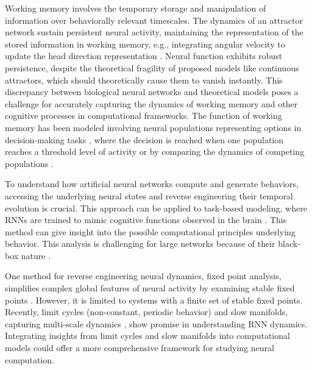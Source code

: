 \documentclass[12pt,letterpaper, onecolumn]{article}
\theoremstyle{definition}
\theoremstyle{remark}
\begin{document}
Working memory involves the temporary storage and manipulation of information over behaviorally relevant timescales. The dynamics of an attractor network sustain persistent neural activity, maintaining the representation of the stored information in working memory, e.g., integrating angular velocity to update the head direction representation \citep{barak2013, barak2014, durstewitz2000, wolpert1995, goncalves2014, burak2009, goldman2007, aksay2007, noorman2022, cueva2021a, cueva2021b}.
Neural function exhibits robust persistence, despite the theoretical fragility of proposed models like continuous attractors, which should theoretically cause them to vanish instantly.
 This discrepancy between biological neural networks and theoretical models poses a challenge for accurately capturing the dynamics of working memory and other cognitive processes in computational frameworks.
The function of working memory has been modeled involving neural populations representing options in decision-making tasks \citep{gold2007neural}, where the decision is reached when one population reaches a threshold level of activity or by comparing the dynamics of competing populations \citep{wong2007, wong2008, hocker2024, esnaola2022flexible}.

To understand how artificial neural networks compute and generate behaviors, accessing the underlying neural states and reverse engineering their temporal evolution is crucial. This approach can be applied to task-based modeling, where RNNs are trained to mimic cognitive functions observed in the brain \citep{darshan2022, barak2017recurrent, durstewitz2023reconstructing, yang2019task, yang2019multiple, yang2020artificial, jarne2023b, song2016}. This method can give insight into the possible computational principles underlying behavior. This analysis is challenging for large networks because of their black-box nature \citep{lipton2018, erasmus2021}.


One method for reverse engineering neural dynamics, fixed point analysis, simplifies complex global features of neural activity by examining stable fixed points \citep{sussillo2013blackbox, sussillo2014, beer2018, maheswaranathan2019universality, driscoll2022, mante2013context}. However, it is limited to systems with a finite set of stable fixed points. Recently, limit cycles (non-constant, periodic behavior) and slow manifolds, capturing multi-scale dynamics \citep{ghazizadeh2021slow, pollock2020},  show promise in understanding RNN dynamics. Integrating insights from limit cycles and slow manifolds into computational models could offer a more comprehensive framework for studying neural computation.
\end{document}
